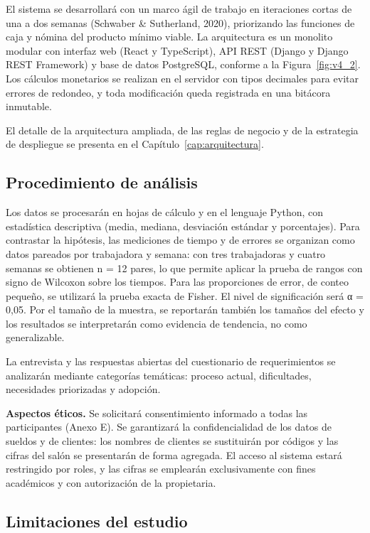 El sistema se desarrollará con un marco ágil de trabajo en iteraciones cortas de una a dos semanas (Schwaber \& Sutherland, 2020), priorizando las funciones de caja y nómina del producto mínimo viable. La arquitectura es un monolito modular con interfaz web (React y TypeScript), API REST (Django y Django REST Framework) y base de datos PostgreSQL, conforme a la Figura~\ref{fig:v4_2}. Los cálculos monetarios se realizan en el servidor con tipos decimales para evitar errores de redondeo, y toda modificación queda registrada en una bitácora inmutable.


El detalle de la arquitectura ampliada, de las reglas de negocio y de la estrategia de despliegue se presenta en el Capítulo~\ref{cap:arquitectura}.

\subsection{Procedimiento de análisis}

Los datos se procesarán en hojas de cálculo y en el lenguaje Python, con estadística descriptiva (media, mediana, desviación estándar y porcentajes). Para contrastar la hipótesis, las mediciones de tiempo y de errores se organizan como datos pareados por trabajadora y semana: con tres trabajadoras y cuatro semanas se obtienen n = 12 pares, lo que permite aplicar la prueba de rangos con signo de Wilcoxon sobre los tiempos. Para las proporciones de error, de conteo pequeño, se utilizará la prueba exacta de Fisher. El nivel de significación será α = 0,05. Por el tamaño de la muestra, se reportarán también los tamaños del efecto y los resultados se interpretarán como evidencia de tendencia, no como generalizable.


La entrevista y las respuestas abiertas del cuestionario de requerimientos se analizarán mediante categorías temáticas: proceso actual, dificultades, necesidades priorizadas y adopción.


\textbf{Aspectos éticos.} Se solicitará consentimiento informado a todas las participantes (Anexo E). Se garantizará la confidencialidad de los datos de sueldos y de clientes: los nombres de clientes se sustituirán por códigos y las cifras del salón se presentarán de forma agregada. El acceso al sistema estará restringido por roles, y las cifras se emplearán exclusivamente con fines académicos y con autorización de la propietaria.


\subsection{Limitaciones del estudio}

